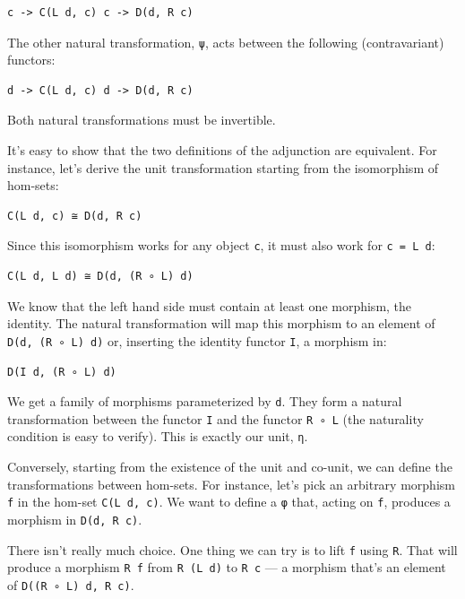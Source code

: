\begin{verbatim}
c -> C(L d, c) c -> D(d, R c)
\end{verbatim}

The other natural transformation, \texttt{ψ}, acts between the following
(contravariant) functors:

\begin{verbatim}
d -> C(L d, c) d -> D(d, R c)
\end{verbatim}

Both natural transformations must be invertible.

It's easy to show that the two definitions of the adjunction are
equivalent. For instance, let's derive the unit transformation starting
from the isomorphism of hom-sets:

\begin{verbatim}
C(L d, c) ≅ D(d, R c)
\end{verbatim}

Since this isomorphism works for any object \texttt{c}, it must also
work for \texttt{c\ =\ L\ d}:

\begin{verbatim}
C(L d, L d) ≅ D(d, (R ∘ L) d)
\end{verbatim}

We know that the left hand side must contain at least one morphism, the
identity. The natural transformation will map this morphism to an
element of \texttt{D(d,\ (R\ ∘\ L)\ d)} or, inserting the identity
functor \texttt{I}, a morphism in:

\begin{verbatim}
D(I d, (R ∘ L) d)
\end{verbatim}

We get a family of morphisms parameterized by \texttt{d}. They form a
natural transformation between the functor \texttt{I} and the functor
\texttt{R\ ∘\ L} (the naturality condition is easy to verify). This is
exactly our unit, \texttt{η}.

Conversely, starting from the existence of the unit and co-unit, we can
define the transformations between hom-sets. For instance, let's pick an
arbitrary morphism \texttt{f} in the hom-set \texttt{C(L\ d,\ c)}. We
want to define a \texttt{φ} that, acting on \texttt{f}, produces a
morphism in \texttt{D(d,\ R\ c)}.

There isn't really much choice. One thing we can try is to lift
\texttt{f} using \texttt{R}. That will produce a morphism \texttt{R\ f}
from \texttt{R\ (L\ d)} to \texttt{R\ c} --- a morphism that's an
element of \texttt{D((R\ ∘\ L)\ d,\ R\ c)}.

